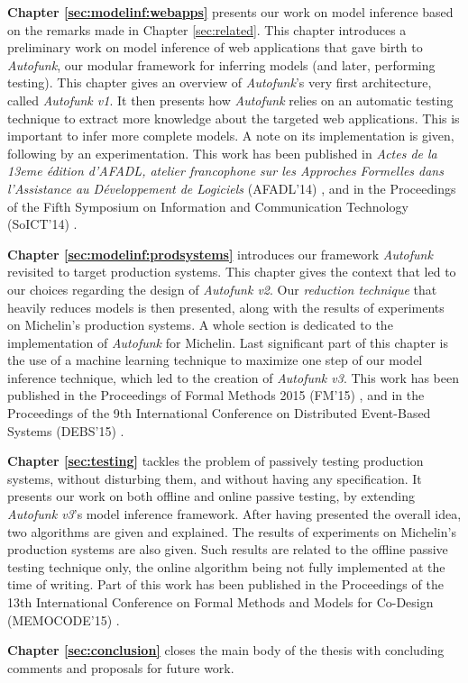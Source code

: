 \textbf{Chapter \ref{sec:modelinf:webapps}} presents our work on
model inference based on the remarks made in Chapter
\ref{sec:related}. This chapter introduces a preliminary work on
model inference of web applications that gave birth to
\textit{Autofunk}, our modular framework for inferring models
(and later, performing testing). This chapter gives an overview
of \textit{Autofunk}'s very first architecture, called
\emph{Autofunk v1}. It then presents how \emph{Autofunk} relies
on an automatic testing technique to extract more knowledge about
the targeted web applications. This is important to infer more
complete models.  A note on its implementation is
given, following by an experimentation. This work has been
published in \emph{Actes de la 13eme {\'e}dition d’AFADL, atelier
francophone sur les Approches Formelles dans l’Assistance au
D{\'e}veloppement de Logiciels} (AFADL'14)
\cite{durand2014inference}, and in the Proceedings of the Fifth
Symposium on Information and Communication Technology (SoICT'14)
\cite{DBLP:conf/soict/DurandS14}.

\textbf{Chapter \ref{sec:modelinf:prodsystems}} introduces our
framework \textit{Autofunk} revisited to target production
systems. This chapter gives the context that led to our choices
regarding the design of \textit{Autofunk v2}. Our \emph{reduction
technique} that heavily reduces models is then presented, along
with the results of experiments on Michelin's production systems.
A whole section is dedicated to the implementation of
\textit{Autofunk} for Michelin. Last significant part of this
chapter is the use of a machine learning technique to maximize
one step of our model inference technique, which led to the
creation of \emph{Autofunk v3}. This work has been published in
the Proceedings of Formal Methods 2015 (FM'15)
\cite{DBLP:conf/fm/DurandS15}, and in the Proceedings of the 9th
International Conference on Distributed Event-Based Systems
(DEBS'15) \cite{DBLP:conf/debs/SalvaD15}.

\textbf{Chapter \ref{sec:testing}} tackles the problem of
passively testing production systems, without disturbing them,
and without having any specification. It presents our work on
both offline and online passive testing, by extending
\textit{Autofunk v3}'s model inference framework. After having
presented the overall idea, two algorithms are given and
explained. The results of experiments on Michelin's production
systems are also given. Such results are related to the offline
passive testing technique only, the online algorithm being not
fully implemented at the time of writing. Part of this work has
been published in the Proceedings of the 13th International
Conference on Formal Methods and Models for Co-Design
(MEMOCODE'15) \cite{7340480}.

\textbf{Chapter \ref{sec:conclusion}} closes the main body of the
thesis with concluding comments and proposals for future work.

\cleardoublepage
\blankpage
